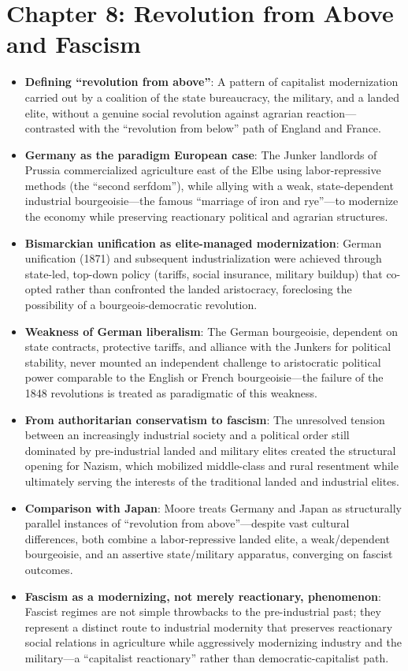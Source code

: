 \documentclass[12pt]{article}
\begin{document}
\section{Chapter 8: Revolution from Above and Fascism}

\begin{itemize}[leftmargin=*, itemsep=4pt]
    \item \textbf{Defining ``revolution from above''}: A pattern of capitalist modernization carried out by a coalition of the state bureaucracy, the military, and a landed elite, without a genuine social revolution against agrarian reaction---contrasted with the ``revolution from below'' path of England and France.
    \item \textbf{Germany as the paradigm European case}: The Junker landlords of Prussia commercialized agriculture east of the Elbe using labor-repressive methods (the ``second serfdom''), while allying with a weak, state-dependent industrial bourgeoisie---the famous ``marriage of iron and rye''---to modernize the economy while preserving reactionary political and agrarian structures.
    \item \textbf{Bismarckian unification as elite-managed modernization}: German unification (1871) and subsequent industrialization were achieved through state-led, top-down policy (tariffs, social insurance, military buildup) that co-opted rather than confronted the landed aristocracy, foreclosing the possibility of a bourgeois-democratic revolution.
    \item \textbf{Weakness of German liberalism}: The German bourgeoisie, dependent on state contracts, protective tariffs, and alliance with the Junkers for political stability, never mounted an independent challenge to aristocratic political power comparable to the English or French bourgeoisie---the failure of the 1848 revolutions is treated as paradigmatic of this weakness.
    \item \textbf{From authoritarian conservatism to fascism}: The unresolved tension between an increasingly industrial society and a political order still dominated by pre-industrial landed and military elites created the structural opening for Nazism, which mobilized middle-class and rural resentment while ultimately serving the interests of the traditional landed and industrial elites.
    \item \textbf{Comparison with Japan}: Moore treats Germany and Japan as structurally parallel instances of ``revolution from above''---despite vast cultural differences, both combine a labor-repressive landed elite, a weak/dependent bourgeoisie, and an assertive state/military apparatus, converging on fascist outcomes.
    \item \textbf{Fascism as a modernizing, not merely reactionary, phenomenon}: Fascist regimes are not simple throwbacks to the pre-industrial past; they represent a distinct route to industrial modernity that preserves reactionary social relations in agriculture while aggressively modernizing industry and the military---a ``capitalist reactionary'' rather than democratic-capitalist path.
\end{itemize}
\end{document}
